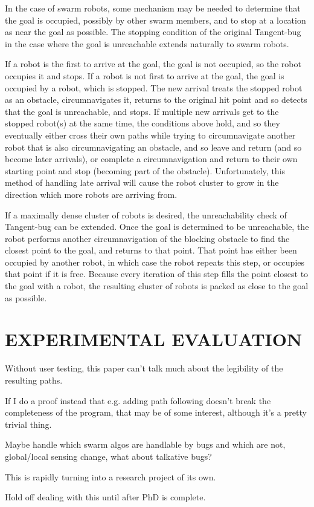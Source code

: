 \documentclass[letterpaper, 10 pt, conference]{ieeeconf}  %
\begin{document}
In the case of swarm robots, some mechanism may be needed to determine that the goal is occupied, possibly by other swarm members, and to stop at a location as near the goal as possible. 
The stopping condition of the original Tangent-bug in the case where the goal is unreachable extends naturally to swarm robots. 

If a robot is the first to arrive at the goal, the goal is not occupied, so the robot occupies it and stops. 
If a robot is not first to arrive at the goal, the goal is occupied by a robot, which is stopped. 
The new arrival treats the stopped robot as an obstacle, circumnavigates it, returns to the original hit point and so detects that the goal is unreachable, and stops. 
If multiple new arrivals get to the stopped robot(s) at the same time, the conditions above hold, and so they eventually either cross their own paths while trying to circumnavigate another robot that is also circumnavigating an obstacle, and so leave and return (and so become later arrivals), or complete a circumnavigation and return to their own starting point and stop (becoming part of the obstacle).
Unfortunately, this method of handling late arrival will cause the robot cluster to grow in the direction which more robots are arriving from. 

If a maximally dense cluster of robots is desired, the unreachability check of Tangent-bug can be extended. 
Once the goal is determined to be unreachable, the robot performs another circumnavigation of the blocking obstacle to find the closest point to the goal, and returns to that point. 
That point has either been occupied by another robot, in which case the robot repeats this step, or occupies that point if it is free. 
Because every iteration of this step fills the point closest to the goal with a robot, the resulting cluster of robots is packed as close to the goal as possible. 


 
\section{EXPERIMENTAL EVALUATION}

Without user testing, this paper can't talk much about the legibility of the resulting paths. 

If I do a proof instead that e.g. adding path following doesn't break the completeness of the program, that may be of some interest, although it's a pretty trivial thing. 

Maybe handle which swarm algos are handlable by bugs and which are not, global/local sensing change, what about talkative bugs?

This is rapidly turning into a research project of its own. 


Hold off dealing with this until after PhD is complete.





\end{document}
